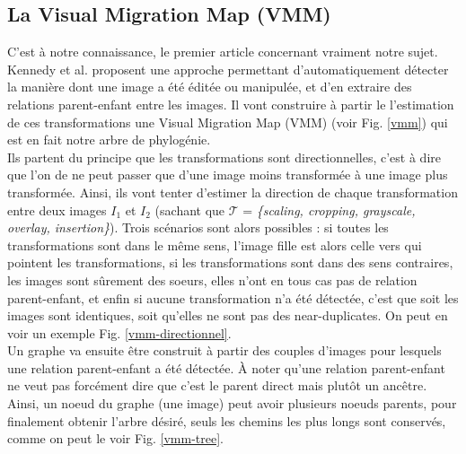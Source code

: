 \documentclass[utf8]{stageM2R} %
\begin{document}
\subsection{La Visual Migration Map (VMM)}
C'est à notre connaissance, le premier article concernant vraiment notre sujet. Kennedy et al. \cite{kennedy2008internet} proposent une approche permettant d'automatiquement détecter la manière dont une image a été éditée ou manipulée, et d'en extraire des relations parent-enfant entre les images. Il vont construire à partir le l'estimation de ces transformations une Visual Migration Map (VMM) (voir Fig. \ref{vmm}) qui est en fait notre arbre de phylogénie.
\\ \indent
Ils partent du principe que les transformations sont directionnelles, c'est à dire que l'on de ne peut passer que d'une image moins transformée à une image plus transformée. Ainsi, ils vont tenter d'estimer la direction de chaque transformation entre deux images $I_{1}$ et $I_{2}$ (sachant que $\mathcal{T}$ = \textit{\{scaling, cropping, grayscale, overlay, insertion\}}). Trois scénarios sont alors possibles : si toutes les transformations sont dans le même sens, l'image fille est alors celle vers qui pointent les transformations, si les transformations sont dans des sens contraires, les images sont sûrement des soeurs, elles n'ont en tous cas pas de relation parent-enfant, et enfin si aucune transformation n'a été détectée, c'est que soit les images sont identiques, soit qu'elles ne sont pas des near-duplicates. On peut en voir un exemple Fig. \ref{vmm-directionnel}.
\\ \indent
Un graphe va ensuite être construit à partir des couples d'images pour lesquels une relation parent-enfant a été détectée. À noter qu'une relation parent-enfant ne veut pas forcément dire que c'est le parent direct mais plutôt un ancêtre. Ainsi, un noeud du graphe (une image) peut avoir plusieurs noeuds parents, pour finalement obtenir l'arbre désiré, seuls les chemins les plus longs sont conservés, comme on peut le voir Fig. \ref{vmm-tree}.


\end{document}
